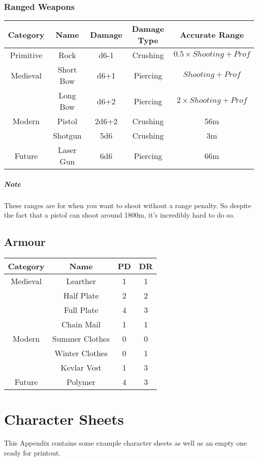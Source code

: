\subsection{Ranged Weapons}
\begin{center}
\begin{tabular}{c|c|c|c|c}
    \textbf{Category} & \textbf{Name} & \textbf{Damage} & \textbf{Damage Type} & \textbf{Accurate Range} \\\hline
    Primitive & Rock        & d6-1  & Crushing & $0.5 \times Shooting + Prof$  \\\hline
    Medieval  & Short Bow   & d6+1  & Piercing & $Shooting + Prof$ \\
              & Long Bow    & d6+2  & Piercing & $2 \times Shooting + Prof$ \\\hline
    Modern    & Pistol      & 2d6+2 & Crushing & 56m \\
              & Shotgun     & 5d6   & Crushing & 3m \\\hline
    Future    & Laser Gun   & 6d6   & Piercing & 66m \\
\end{tabular}
\end{center}
\paragraph{Note} These ranges are for when you want to shoot without a range penalty.
So despite the fact that a pistol can shoot around 1800m, it's incredibly hard to do so.

\section{Armour}
\begin{center}
\begin{tabular}{c|c|c|c}
\textbf{Category} & \textbf{Name}  & \textbf{PD} & \textbf{DR}\\\hline
         Medieval & Learther       & 1 & 1 \\
                  & Half Plate     & 2 & 2 \\
                  & Full Plate     & 4 & 3 \\
                  & Chain Mail     & 1 & 1 \\\hline
           Modern & Summer Clothes & 0 & 0 \\
                  & Winter Clothes & 0 & 1 \\
                  & Kevlar Vest    & 1 & 3 \\\hline
           Future & Polymer        & 4 & 3 \\
\end{tabular}
\end{center}

\chapter{Character Sheets}\label{app:character-sheets}
This Appendix contains some example character sheets as well as an empty one ready for printout.

